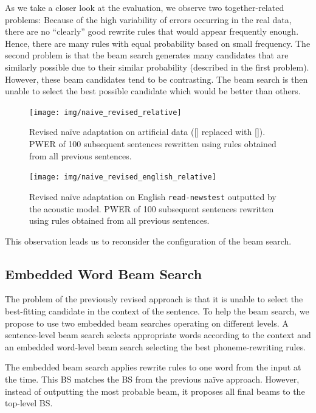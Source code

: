 As we take a closer look at the evaluation, we observe two together-related problems: Because of the high variability of errors occurring in the real data, there are no ``clearly'' good rewrite rules that would appear frequently enough. Hence, there are many rules with equal probability based on small frequency. The second problem is that the beam search generates many candidates that are similarly possible due to their similar probability (described in the first problem). However, these beam candidates tend to be contrasting. The beam search is then unable to select the best possible candidate which would be better than others.

\begin{figure}[h]
    \texttt{[image: img/naive\_revised\_relative]}
    \caption{Revised na\"ive adaptation on artificial data ([] replaced with []). PWER of 100 subsequent sentences rewritten using rules obtained from all previous sentences.}
    \label{fig:naive_revised} 
\end{figure}

\begin{figure}[h]
    \texttt{[image: img/naive\_revised\_english\_relative]}
    \caption{Revised na\"ive adaptation on English \texttt{read-newstest} outputted by the acoustic model. PWER of 100 subsequent sentences rewritten using rules obtained from all previous sentences.}
    \label{fig:naive_revised_en} 
\end{figure}

This observation leads us to reconsider the configuration of the beam search.

\subsection{Embedded Word Beam Search}
The problem of the previously revised approach is that it is unable to select the best-fitting candidate in the context of the sentence. To help the beam search, we propose to use two embedded beam searches operating on different levels. A sentence-level beam search selects appropriate words according to the context and an embedded word-level beam search selecting the best phoneme-rewriting rules.

The embedded beam search applies rewrite rules to one word from the input at the time. This BS matches the BS from the previous na\"ive approach. However, instead of outputting the most probable beam, it proposes all final beams to the top-level BS.

